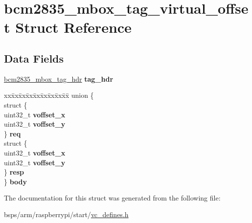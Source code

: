 \hypertarget{structbcm2835__mbox__tag__virtual__offset}{}\section{bcm2835\+\_\+mbox\+\_\+tag\+\_\+virtual\+\_\+offset Struct Reference}
\label{structbcm2835__mbox__tag__virtual__offset}
\subsection*{Data Fields}
\begin{DoxyCompactItemize}
\item 
\mbox{\label{structbcm2835__mbox__tag__virtual__offset_a4b8cf9c7e0e82ee4cfcce17ff7fb87a4}} 
\mbox{\hyperlink{structbcm2835__mbox__tag__hdr}{bcm2835\+\_\+mbox\+\_\+tag\+\_\+hdr}} {\bfseries tag\+\_\+hdr}
\item 
\mbox{\label{structbcm2835__mbox__tag__virtual__offset_ab8d2dbca08aacb31a9266b47e2075425}} 
\begin{tabbing}
xx\=xx\=xx\=xx\=xx\=xx\=xx\=xx\=xx\=\kill
union \{\\
\>struct \{\\
\>\>uint32\_t {\bfseries voffset\_x}\\
\>\>uint32\_t {\bfseries voffset\_y}\\
\>\} {\bfseries req}\\
\>struct \{\\
\>\>uint32\_t {\bfseries voffset\_x}\\
\>\>uint32\_t {\bfseries voffset\_y}\\
\>\} {\bfseries resp}\\
\} {\bfseries body}\\

\end{tabbing}\end{DoxyCompactItemize}


The documentation for this struct was generated from the following file\+:\begin{DoxyCompactItemize}
\item 
bsps/arm/raspberrypi/start/\mbox{\hyperlink{vc__defines_8h}{vc\+\_\+defines.\+h}}\end{DoxyCompactItemize}
